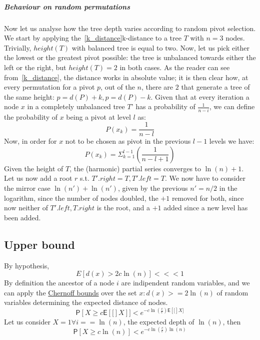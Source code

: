\documentclass{article}
\newcommand*{\expect}[1]{\mathsf{E}\left[{#1}\right]}  %
\newcommand*{\prob}{\mathsf{P}}    %
\begin{document}
\subparagraph{Behaviour on random permutations}
Now let us analyse how the tree depth varies according to random pivot selection.
We start by applying the~\ref{k_distance}k-distance to a tree $T$ with $n = 3$
nodes.
Trivially, $height(T)$ with balanced tree is equal to two.
Now, let us pick either the lowest or the greatest pivot possible: the tree
is unbalanced towards either the left or the right, but $height(T) = 2$ in
both cases.
As the reader can see from~\ref{k_distance}, the distance works in absolute
value; it is then clear how, at every permutation for a pivot $p$, out of the
$n$, there are $2$ that generate a tree of the same height:
$p = d(P) + k, p = d(P) - k$.
Given that at every iteration a node $x$ in a completely unbalanced tree $T$'
has a probability of $\frac{1}{n - i}$, we can define the probability of $x$
being a pivot at level $l$ as:
    \begin{equation}
    P(x_{k}) = \frac{1}{n - l}
    \end{equation}
Now, in order for $x$ not to be chosen as pivot in the previous $l - 1$
levels we have:
    \begin{equation}
    P(x_{k}) = \Sigma_{k = 1}^{l - 1} (\frac{1}{n - l + 1})
    \end{equation}
Given the height of $T$, the (harmonic) partial series converges to
$\ln{(n)} + 1$.
Let us now add a root $r$ s.t. $T'.right = T, T'.left = T$.
We now have to consider the mirror case $\ln{(n')} + \ln{(n')}$,
given by the previous $n' = n/2$ in the logarithm, since the number of nodes
doubled, the $+1$ removed for both, since now neither of $T'.left, T.right$
is the root, and a $+1$ added since a new level has been added.

\subsection{Upper bound}

By hypothesis,
    \begin{equation}
    E[d(x) > 2 c \ln(n)] <<< 1
    \end{equation}
By definition the ancestor of a node $i$ are indipendent random variables,
and we can apply the \href{https://en.wikipedia.org/wiki/Chernoff_bound}{Chernoff
bounds} over the set ${x: d(x) >= 2 \ln(n)}$ of random variables determining
the expected distance of nodes.
\begin{equation*}
    \prob[X \geq c \expect[X]] < e^{-c \ln(\frac{c}{e})\expect[X]}
\end{equation*}
Let us consider $X = 1 \forall i == \ln(n)$, the expected depth of $\ln(n)$,
then
\begin{equation*}
    \prob[X \geq c \ln(n)] < e^{-c \ln(\frac{c}{e})\ln(n)}
\end{equation*}
\end{document}
